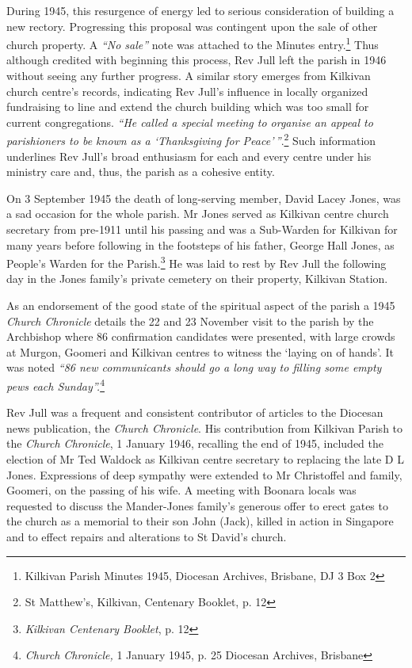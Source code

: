 During 1945, this resurgence of energy led to serious consideration of building a new rectory. Progressing this proposal was contingent upon the sale of other church property. A \emph{``No sale''} note was attached to the Minutes entry.\footnote{Kilkivan Parish Minutes 1945, Diocesan Archives, Brisbane, DJ 3 Box 2} Thus although credited with beginning this process, Rev Jull left the parish in 1946 without seeing any further progress. A similar story emerges from Kilkivan church centre's records, indicating Rev Jull's influence in locally organized fundraising to line and extend the church building which was too small for current congregations. \emph{``He called a special meeting to organise an appeal to parishioners to be known as a `Thanksgiving for Peace'\,''}.\footnote{St Matthew's, Kilkivan, Centenary Booklet, p. 12} Such information underlines Rev Jull's broad enthusiasm for each and every centre under his ministry care and, thus, the parish as a cohesive entity.

On 3 September 1945 the death of long-serving member, David Lacey Jones, was a sad occasion for the whole parish. Mr Jones served as Kilkivan centre church secretary from pre-1911 until his passing and was a Sub-Warden for Kilkivan for many years before following in the footsteps of his father, George Hall Jones, as People's Warden for the Parish.\footnote{\emph{Kilkivan Centenary Booklet}, p. 12} He was laid to rest by Rev Jull the following day in the Jones family's private cemetery on their property, Kilkivan Station.

As an endorsement of the good state of the spiritual aspect of the parish a 1945 \emph{Church Chronicle} details the 22 and 23 November visit to the parish by the Archbishop where 86 confirmation candidates were presented, with large crowds at Murgon, Goomeri and Kilkivan centres to witness the `laying on of hands'. It was noted \emph{``86 new communicants should go a long way to filling some empty pews each Sunday''.}\footnote{\emph{Church Chronicle,} 1 January 1945, p. 25 Diocesan Archives, Brisbane}

Rev Jull was a frequent and consistent contributor of articles to the Diocesan news publication, the \emph{Church Chronicle}. His contribution from Kilkivan Parish to the \emph{Church Chronicle}, 1 January 1946, recalling the end of 1945, included the election of Mr Ted Waldock as Kilkivan centre secretary to replacing the late D L Jones. Expressions of deep sympathy were extended to Mr Christoffel and family, Goomeri, on the passing of his wife. A meeting with Boonara locals was requested to discuss the Mander-Jones family's generous offer to erect gates to the church as a memorial to their son John (Jack), killed in action in Singapore and to effect repairs and alterations to St David's church.

